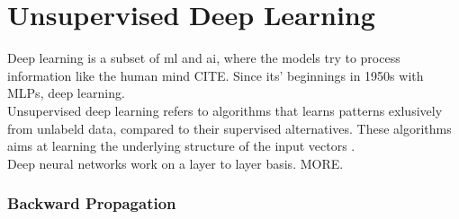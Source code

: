 \section{Unsupervised Deep Learning}

Deep learning is a subset of ml and ai, where the models try to process information like the human mind CITE. Since its' beginnings in 1950s with MLPs, deep learning. \\

Unsupervised deep learning refers to algorithms that learns patterns exlusively from unlabeld data, compared to their supervised alternatives. These algorithms aims at learning the underlying structure of the input vectors \cite{KARHUNEN2015125}. \\

Deep neural networks work on a layer to layer basis. MORE. \\




\subsubsection{Backward Propagation}









